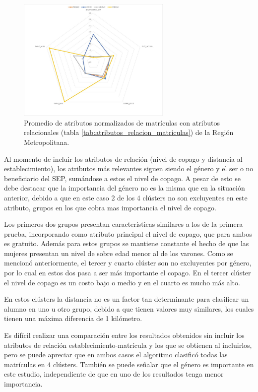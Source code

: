 \begin{figure}[H]
    \centering
    \includegraphics[width=0.66\textwidth]{images/radar_chart_matriculas_con.jpg}
    \caption{Promedio de atributos normalizados de matrículas con atributos relacionales (tabla \ref{tab:atributos_relacion_matriculas}) de la Región Metropolitana.}
    \label{fig:radar_mat_rel}
\end{figure}

Al momento de incluir los atributos de relación (nivel de copago y distancia al establecimiento), los atributos más relevantes siguen siendo el género y el ser o no beneficiario del SEP, sumándose a estos el nivel de copago. A pesar de esto se debe destacar que la importancia del género no es la misma que en la situación anterior, debido a que en este caso 2 de los 4 clústers no son excluyentes en este atributo, grupos en los que cobra mas importancia el nivel de copago.

Los primeros dos grupos presentan características similares a los de la primera prueba, incorporando como atributo principal el nivel de copago, que para ambos es gratuito. Además para estos grupos se mantiene constante el hecho de que las mujeres presentan un nivel de sobre edad menor al de los varones. Como se mencionó anteriormente, el tercer y cuarto clúster son no excluyentes por género, por lo cual en estos dos pasa a ser más importante el copago. En el tercer clúster el nivel de copago es un costo bajo o medio y en el cuarto es mucho más alto. 

En estos clústers la distancia no es un factor tan determinante para clasificar un alumno en uno u otro grupo, debido a que tienen valores muy similares, los cuales tienen una máxima diferencia de 1 kilómetro.

Es difícil realizar una comparación entre los resultados obtenidos sin incluir los atributos de relación establecimiento-matrícula y los que se obtienen al incluirlos, pero se puede apreciar que en ambos casos el algoritmo clasificó todas las matrículas en 4 clústers. También se puede señalar que el género es importante en este estudio, independiente de que en uno de los resultados tenga menor importancia.


